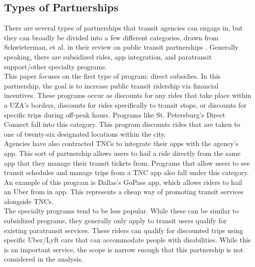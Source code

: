 \documentclass [12pt]{report}
\begin{document}
\subsection*{Types of Partnerships}
There are several types of partnerships that transit agencies can engage in, but they can broadly be divided into a few different categories, drawn from Schwieterman, et al. in their review on public transit partnerships \parencite{depaul}. Generally speaking, there are subsidized rides, app integration, and paratransit support/other specialty programs. \\
\indent This paper focuses on the first type of program: direct subsidies. In this partnership, the goal is to increase public transit ridership via financial incentives. These programs occur as discounts for any rides that take place within a UZA's borders, discounts for rides specifically to transit stops, or discounts for specific trips during off-peak hours. Programs like St. Petersburg's Direct Connect fall into this category. This program discounts rides that are taken to one of twenty-six designated locations within the city.\\
\indent Agencies have also contracted TNCs to integrate their apps with the agency's app. This sort of partnership allows users to hail a ride directly from the same app that they manage their transit tickets from. Programs that allow users to see transit schedules and manage trips from a TNC app also fall under this category. An example of this program is Dallas's GoPass app, which allows riders to hail an Uber from in app. This represents a cheap way of promoting transit services alongside TNCs.\\
\indent The specialty programs tend to be less popular. While these can be similar to subsidized programs, they generally only apply to transit users qualify for existing paratransit services. These riders can qualify for discounted trips using specific Uber/Lyft cars that can accommodate people with disabilities. While this is an important service, the scope is narrow enough that this partnership is not considered in the analysis.

\end{document}
